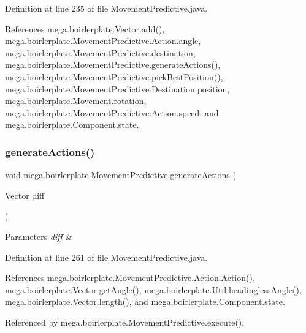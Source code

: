 Definition at line 235 of file Movement\+Predictive.\+java.



References mega.\+boirlerplate.\+Vector.\+add(), mega.\+boirlerplate.\+Movement\+Predictive.\+Action.\+angle, mega.\+boirlerplate.\+Movement\+Predictive.\+destination, mega.\+boirlerplate.\+Movement\+Predictive.\+generate\+Actions(), mega.\+boirlerplate.\+Movement\+Predictive.\+pick\+Best\+Position(), mega.\+boirlerplate.\+Movement\+Predictive.\+Destination.\+position, mega.\+boirlerplate.\+Movement.\+rotation, mega.\+boirlerplate.\+Movement\+Predictive.\+Action.\+speed, and mega.\+boirlerplate.\+Component.\+state.

\mbox{\label{classmega_1_1boirlerplate_1_1_movement_predictive_a71f4b152fc0a396c65b0af8bd9ede736}} 
\subsubsection{\texorpdfstring{generate\+Actions()}{generateActions()}}
{\footnotesize\ttfamily void mega.\+boirlerplate.\+Movement\+Predictive.\+generate\+Actions (\begin{DoxyParamCaption}\item[{\hyperlink{classmega_1_1boirlerplate_1_1_vector}{Vector}}]{diff }\end{DoxyParamCaption})\hspace{0.3cm}{\ttfamily [private]}}


\begin{DoxyParams}{Parameters}
{\em diff} & \\
\hline
\end{DoxyParams}


Definition at line 261 of file Movement\+Predictive.\+java.



References mega.\+boirlerplate.\+Movement\+Predictive.\+Action.\+Action(), mega.\+boirlerplate.\+Vector.\+get\+Angle(), mega.\+boirlerplate.\+Util.\+headingless\+Angle(), mega.\+boirlerplate.\+Vector.\+length(), and mega.\+boirlerplate.\+Component.\+state.



Referenced by mega.\+boirlerplate.\+Movement\+Predictive.\+execute().

